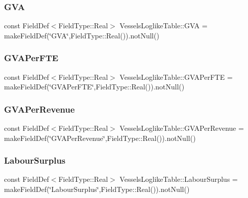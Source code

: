 \mbox{\label{class_vessels_loglike_table_a0ef23c6b18943a3659dc7efb19c307ff}} 
\subsubsection{\texorpdfstring{GVA}{GVA}}
{\footnotesize\ttfamily const Field\+Def$<$Field\+Type\+::\+Real$>$ Vessels\+Loglike\+Table\+::\+G\+VA = make\+Field\+Def(\char`\"{}G\+VA\char`\"{},Field\+Type\+::\+Real()).not\+Null()}

\mbox{\label{class_vessels_loglike_table_a1a08f27ef58820a7aa799f9db4502249}} 
\subsubsection{\texorpdfstring{GVAPerFTE}{GVAPerFTE}}
{\footnotesize\ttfamily const Field\+Def$<$Field\+Type\+::\+Real$>$ Vessels\+Loglike\+Table\+::\+G\+V\+A\+Per\+F\+TE = make\+Field\+Def(\char`\"{}G\+V\+A\+Per\+F\+TE\char`\"{},Field\+Type\+::\+Real()).not\+Null()}

\mbox{\label{class_vessels_loglike_table_a28f91f0e4042d71e1bf5fb2d1929d07c}} 
\subsubsection{\texorpdfstring{GVAPerRevenue}{GVAPerRevenue}}
{\footnotesize\ttfamily const Field\+Def$<$Field\+Type\+::\+Real$>$ Vessels\+Loglike\+Table\+::\+G\+V\+A\+Per\+Revenue = make\+Field\+Def(\char`\"{}G\+V\+A\+Per\+Revenue\char`\"{},Field\+Type\+::\+Real()).not\+Null()}

\mbox{\label{class_vessels_loglike_table_a7978a471eba2f987bf09b4a0a619baff}} 
\subsubsection{\texorpdfstring{LabourSurplus}{LabourSurplus}}
{\footnotesize\ttfamily const Field\+Def$<$Field\+Type\+::\+Real$>$ Vessels\+Loglike\+Table\+::\+Labour\+Surplus = make\+Field\+Def(\char`\"{}Labour\+Surplus\char`\"{},Field\+Type\+::\+Real()).not\+Null()}

